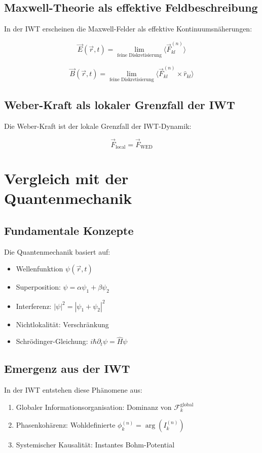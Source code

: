 \subsection{Maxwell-Theorie als effektive Feldbeschreibung}

In der IWT erscheinen die Maxwell-Felder als effektive Kontinuumsnäherungen:

\[
\vec{E}(\vec{r}, t) = \lim_{\text{feine Diskretisierung}} \langle \vec{F}_{kl}^{(n)} \rangle
\]

\[
\vec{B}(\vec{r}, t) = \lim_{\text{feine Diskretisierung}} \langle \vec{F}_{kl}^{(n)} \times \hat{r}_{kl} \rangle
\]

\subsection{Weber-Kraft als lokaler Grenzfall der IWT}

Die Weber-Kraft ist der lokale Grenzfall der IWT-Dynamik:

\[
\vec{F}_{\text{local}} = \vec{F}_{\text{WED}}
\]

\section{Vergleich mit der Quantenmechanik}

\subsection{Fundamentale Konzepte}

Die Quantenmechanik basiert auf:
\begin{itemize}
\item Wellenfunktion \( \psi(\vec{r}, t) \)
\item Superposition: \( \psi = \alpha\psi_1 + \beta\psi_2 \)
\item Interferenz: \( |\psi|^2 = |\psi_1 + \psi_2|^2 \)
\item Nichtlokalität: Verschränkung
\item Schrödinger-Gleichung: \( i\hbar\partial_t\psi = \hat{H}\psi \)
\end{itemize}

\subsection{Emergenz aus der IWT}

In der IWT entstehen diese Phänomene aus:
\begin{enumerate}
\item Globaler Informationsorganisation: Dominanz von \( \mathcal{F}_k^{\text{global}} \)
\item Phasenkohärenz: Wohldefinierte \( \phi_k^{(n)} = \arg(I_k^{(n)}) \)
\item Systemischer Kausalität: Instantes Bohm-Potential
\end{enumerate}

